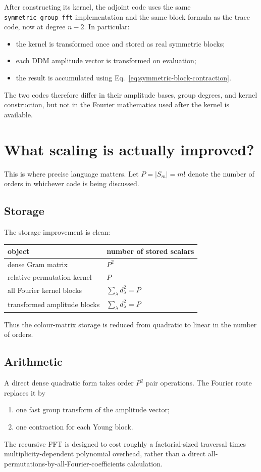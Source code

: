 \documentclass[11pt,a4paper]{article}
\newcommand{\code}[1]{\texttt{#1}}
\begin{document}
After constructing its kernel, the adjoint code uses the same
\code{symmetric\_group\_fft} implementation and the same block formula as the
trace code, now at degree $n-2$.  In particular:
\begin{itemize}
  \item the kernel is transformed once and stored as real symmetric blocks;
  \item each DDM amplitude vector is transformed on evaluation;
  \item the result is accumulated using Eq.~\eqref{eq:symmetric-block-contraction}.
\end{itemize}
The two codes therefore differ in their amplitude bases, group degrees, and
kernel construction, but not in the Fourier mathematics used after the
kernel is available.

\section{What scaling is actually improved?}

This is where precise language matters.  Let $P=|S_m|=m!$ denote the number
of orders in whichever code is being discussed.

\subsection{Storage}

The storage improvement is clean:
\begin{center}
\begin{tabular}{ll}
  \toprule
  object & number of stored scalars \\
  \midrule
  dense Gram matrix & $P^2$ \\
  relative-permutation kernel & $P$ \\
  all Fourier kernel blocks &
     $\sum_\lambda d_\lambda^2=P$ \\
  transformed amplitude blocks &
     $\sum_\lambda d_\lambda^2=P$ \\
  \bottomrule
\end{tabular}
\end{center}
Thus the colour-matrix storage is reduced from quadratic to linear in the
number of orders.

\subsection{Arithmetic}

A direct dense quadratic form takes order $P^2$ pair operations.  The
Fourier route replaces it by
\begin{enumerate}
  \item one fast group transform of the amplitude vector;
  \item one contraction for each Young block.
\end{enumerate}
The recursive FFT is designed to cost roughly a factorial-sized traversal
times multiplicity-dependent polynomial overhead, rather than a direct
all-permutations-by-all-Fourier-coefficients calculation.
\end{document}
